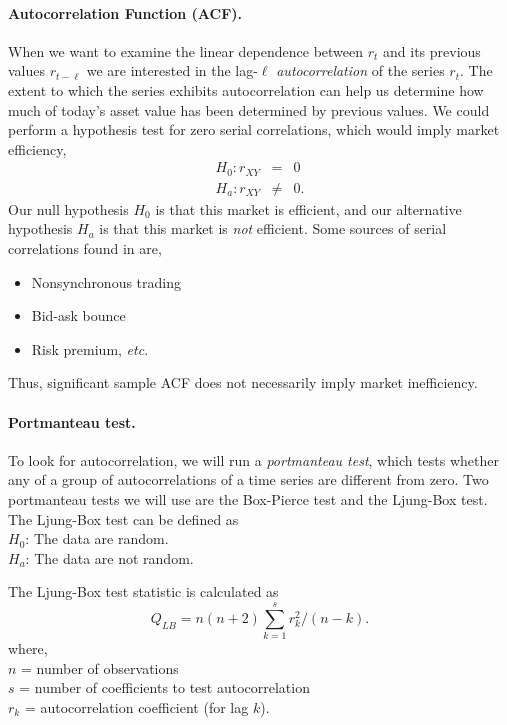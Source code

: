 \paragraph{Autocorrelation Function (ACF).} When we want to examine the linear dependence between $r_t$ and its previous values $r_{t-\ell}$ we are interested in the lag-$\ell$ \emph{autocorrelation} of the series $r_t$.
\marginpar{\begin{small}\begin{flushleft}\textcolor{blue}{Existence of serial correlations implies that the return is predictable, indicating market inefficiency.}\end{flushleft}\end{small}}
The extent to which the series exhibits autocorrelation can help us determine how much of today's asset value has been determined by previous values. We could perform a hypothesis test for zero serial correlations, which would imply market efficiency,
\begin{eqnarray*}
H_0 : r_{XY} &=& 0 \\
H_a : r_{XY} &\ne& 0.
\end{eqnarray*}
Our null hypothesis $H_0$ is that this market is efficient, and our alternative hypothesis $H_a$ is that this market is \emph{not} efficient. Some sources of serial correlations found in \fts{} are,
\begin{itemize}
\item Nonsynchronous trading 
\item Bid-ask bounce 
\item Risk premium, \textit{etc}. 
\end{itemize}
Thus, significant sample ACF does not necessarily imply market 
inefficiency. 

\paragraph{Portmanteau test.} To look for autocorrelation, we will run a \emph{portmanteau test}, which tests whether any of a group of autocorrelations of a time series are different from zero. Two portmanteau tests we will use are the Box-Pierce test and the Ljung-Box test. The Ljung-Box test can be defined as \\
$H_0$: 	The data are random. \\
$H_a$: 	The data are not random.
\bigskip

The Ljung-Box test statistic is calculated as
\begin{equation}
Q_{LB}=n(n+2)\sum_{k=1}^s r_k^2/(n-k).
\label{eq:Ljung-Box}
\end{equation}
where, \\
$n$ = number of observations \\
$s$ = number of coefficients to test autocorrelation \\
$r_k$ = autocorrelation coefficient (for lag $k$).
\bigskip

